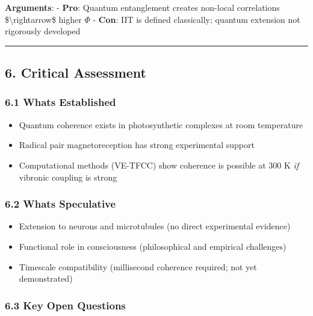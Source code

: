 \textbf{Arguments}: - \textbf{Pro}: Quantum entanglement creates
non-local correlations \$\textbackslash rightarrow\$ higher \(\Phi\) -
\textbf{Con}: IIT is defined classically; quantum extension not
rigorously developed

\begin{center}\rule{0.5\linewidth}{0.5pt}\end{center}

\subsection{6. Critical Assessment}\label{critical-assessment}

\subsubsection{\texorpdfstring{6.1 What\textquotesingle s Established
}{6.1 What\textquotesingle s Established }}\label{whats-established}

\begin{itemize}
\tightlist
\item
  Quantum coherence exists in photosynthetic complexes at room
  temperature
\item
  Radical pair magnetoreception has strong experimental support
\item
  Computational methods (VE-TFCC) show coherence is possible at 300 K
  \emph{if} vibronic coupling is strong
\end{itemize}

\subsubsection{\texorpdfstring{6.2 What\textquotesingle s Speculative
}{6.2 What\textquotesingle s Speculative }}\label{whats-speculative}

\begin{itemize}
\tightlist
\item
  Extension to neurons and microtubules (no direct experimental
  evidence)
\item
  Functional role in consciousness (philosophical and empirical
  challenges)
\item
  Timescale compatibility (millisecond coherence required; not yet
  demonstrated)
\end{itemize}

\subsubsection{6.3 Key Open Questions}\label{key-open-questions}

